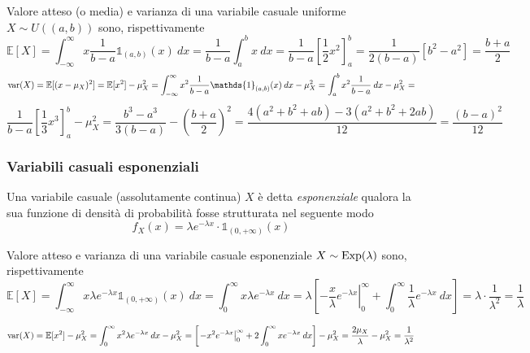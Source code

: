                 Valore atteso (o media) e varianza di una variabile casuale uniforme $X \sim U((a, b))$ sono, rispettivamente
                \[
                    \mathbb{E}[X] = \int_{-\infty}^{\infty} x \frac{1}{b - a}\mathds{1}_{(a, b)}(x) \: dx =
                    \frac{1}{b - a} \int_{a}^{b} x \: dx =
                    \frac{1}{b - a} \left[\frac{1}{2}x^{2}\right]_{a}^{b} =
                    \frac{1}{2 (b - a)} [b^{2} - a^{2}] =
                    \frac{b + a}{2}
                \]
                \[
                    \textnormal{var}(X) = \mathbb{E}[(x - \mu_{X})^{2}] =
                    \mathbb{E}[x^{2}] - \mu_{X}^{2} =
                    \int_{-\infty}^{\infty} x^{2} \frac{1}{b - a} \mathds{1}_{(a ,b)}(x) \: dx - \mu_{X}^{2} =
                    \int_{a}^{b} x^{2} \frac{1}{b - a} \: dx - \mu_{X}^{2} =
                \]
                \[
                    \frac{1}{b - a} \left[\frac{1}{3} x^{3}\right]^{b}_{a} - \mu_{X}^{2} =
                    \frac{b^{3} - a^{3}}{3 (b - a)} - \left(\frac{b + a}{2}\right)^{2} =
                    \frac{4 (a^{2} + b^{2} + ab) - 3(a^{2} + b^{2} + 2ab)}{12} = \frac{(b - a)^{2}}{12}
                \]



            \subsubsection{Variabili casuali esponenziali}
                Una variabile casuale (assolutamente continua) $X$ è detta \textit{esponenziale} qualora la sua funzione di densità di probabilità fosse strutturata nel seguente modo
                \[
                    f_{X}(x) = \lambda e^{-\lambda x} \cdot \mathds{1}_{(0, +\infty)}(x)
                \]

                Valore atteso e varianza di una variabile casuale esponenziale $X \sim \textnormal{Exp}(\lambda)$ sono, rispettivamente
                \[
                    \mathbb{E}[X] = \int_{-\infty}^{\infty} x \lambda e^{- \lambda x} \mathds{1}_{(0, +\infty)}(x) \: dx =
                    \int_{0}^{\infty} x \lambda e^{- \lambda x} \: dx =
                    \lambda \left[\left. -\frac{x}{\lambda} e^{- \lambda x} \right|_{0}^{\infty} + \int_{0}^{\infty} \frac{1}{\lambda} e^{-\lambda x} \: dx\right] =
                    \lambda \cdot \frac{1}{\lambda^{2}} =
                    \frac{1}{\lambda}
                \]

                \[
                    \textnormal{var}(X) = \mathbb{E}[x^{2}] - \mu_{X}^{2} =
                    \int_{0}^{\infty} x^{2} \lambda e^{- \lambda x} \: dx - \mu_{X}^{2} =
                    \left[\left. - x^{2} e^{- \lambda x} \right|_{0}^{\infty} + 2 \int_{0}^{\infty} x e^{- \lambda x} \: dx\right] - \mu_{X}^{2} =
                    \frac{2 \mu_{X}}{\lambda} - \mu_{X}^{2} =
                    \frac{1}{\lambda^{2}}
                \]

